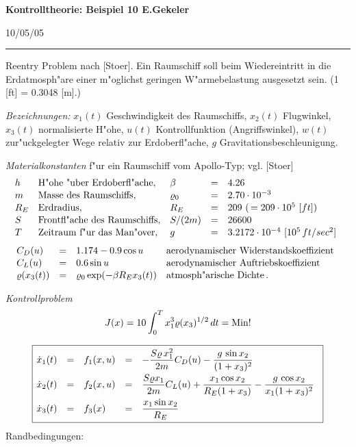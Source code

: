 \documentclass[12pt,a4paper,twoside,leqno]{article}
\newcommand{\Release}{10/05/05} %
\begin{document}
{\large\bf Kontrolltheorie: Beispiel 10 \hfill E.Gekeler}
\par
\vspace{-0.5ex}
\hfill{\footnotesize\Release\ }
\par\hrule\par\vspace{2ex}
Reentry Problem nach [Stoer].
Ein Raumschiff soll beim Wiedereintritt in die Erdatmosph"are einer m"oglichst
geringen W"armebelastung ausgesetzt sein.
(1 [ft] = 0.3048 [m].)
\par
{\em Bezeichnungen:}
$x_1(t)$ Geschwindigkeit des Raumschiffs,
$x_2(t)$ Flugwinkel,
$x_3(t)$ normalisierte H"ohe,
$u(t)$ Kontrollfunktion (Angriffswinkel),
$w(t)$ zur"uckgelegter Wege relativ zur Erdoberfl"ache,
$g$ Gravitationsbeschleunigung.
\par
{\em Materialkonstanten} f"ur ein Raumschiff vom {\sc Apollo}-Typ;
vgl. [Stoer]
%
\[
\ba{.}{lllll}
h & \text{H"ohe "uber Erdoberfl"ache},& \beta &=& 4.26\\[0.2ex]
%
m & \text{Masse des Raumschiffs},& \rho_0 &=& 2.70\cdot 10^{-3} \\[0.2ex]
%
R_E & \text{Erdradius}, &      R_E &=& 209 \ (\, = 209\cdot 10^5\  [ft])\\[0.2ex]
S & \text{Frontfl"ache des Raumschiffs},&
S/(2m)  &=& 26 600 \\[0.2ex]
%
T & \text{Zeitraum f"ur das Man"over}, &  g &=& 3.2172\cdot 10^{-4}\ [10^5\, ft/sec^2]
\ea{.}
\]
\[
\ba{.}{lcll}
C_D(u) &=& 1.174 - 0.9\cos u &
\text{aerodynamischer Widerstandskoeffizient}\\[0.2ex]
C_L(u) &=& 0.6 \sin u &
\text{aerodynamischer Auftriebskoeffizient}\\[0.2ex]
\rho(x_3(t)) &=& \rho_0\exp (-\beta R_E x_3(t)) &
 \text{atmosph"arische Dichte}\,.
\ea{.}
\]
\par
{\em Kontrollproblem}
%
\[
J(x) = \dis 10\int_0^Tx^3_1 \rho(x_3)^{1/2}\, dt = \Min !
\]
\par\vspace{1ex}
\[
\fbox{$
\ba{.}{llllll}
\dot{x}_1(t) &=& f_1(x,u) &=&
\dis  - \frac{S\rho\, x_1^2}{2 m}C_D(u)
     - \frac{g \, \sin x_2}{(1 + x_3)^2}\\[2ex]
%
\dot{x}_2(t) &=& f_2(x,u) &=&
\dis \frac{S \rho x_1}{2 m}C_L(u)
+ \frac{x_1 \cos x_2}{R_E(1 + x_3)}
- \frac{g \, \cos x_2}{x_1(1 + x_3)^2}\\[2ex]
%
\dot{x}_3(t) &=& f_3(x) &=&
\dis \frac{x_1 \sin x_2}{R_E}
\ea{.}
$}
\]
Randbedingungen:
\end{document}

